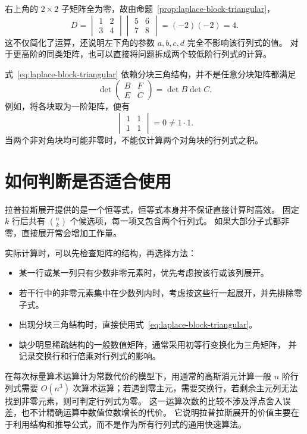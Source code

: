 \documentclass[UTF8,12pt,a4paper,fontset=fandol]{ctexart}
\begin{document}
\begin{solve}
右上角的 $2\times2$ 子矩阵全为零，故由命题~\ref{prop:laplace-block-triangular}，
\[
  D=\begin{vmatrix}1&2\\3&4\end{vmatrix}
    \begin{vmatrix}5&6\\7&8\end{vmatrix}
   =(-2)(-2)=4.
\]
这不仅简化了运算，还说明左下角的参数 $a,b,c,d$ 完全不影响该行列式的值。
对于更高阶的同类矩阵，也可以直接将问题拆成两个较低阶行列式的计算。
\end{solve}

\begin{remark}[零块条件不能随意去掉]
式~\eqref{eq:laplace-block-triangular} 依赖分块三角结构，并不是任意分块矩阵都满足
\[
  \det\begin{pmatrix}B&F\\E&C\end{pmatrix}=\det B\det C.
\]
例如，将各块取为一阶矩阵，便有
\[
  \begin{vmatrix}1&1\\1&1\end{vmatrix}=0\neq1\cdot1.
\]
当两个非对角块均可能非零时，不能仅计算两个对角块的行列式之积。
\end{remark}

\section{如何判断是否适合使用}

拉普拉斯展开提供的是一个恒等式，恒等式本身并不保证直接计算时高效。
固定 $k$ 行后共有 $\binom nk$ 个候选项，每一项又包含两个行列式。
如果大部分子式都非零，直接展开常会增加工作量。

实际计算时，可以先检查矩阵的结构，再选择方法：
\begin{itemize}
  \item 某一行或某一列只有少数非零元素时，优先考虑按该行或该列展开。
  \item 若干行中的非零元素集中在少数列内时，考虑按这些行一起展开，并先排除零子式。
  \item 出现分块三角结构时，直接使用式~\eqref{eq:laplace-block-triangular}。
  \item 缺少明显稀疏结构的一般数值矩阵，通常采用初等行变换化为三角矩阵，
  并记录交换行和行倍乘对行列式的影响。
\end{itemize}

在每次标量算术运算计为常数代价的模型下，用通常的高斯消元计算一般 $n$ 阶行列式需要
$O(n^3)$ 次算术运算；若遇到零主元，需要交换行，若剩余主元列无法找到非零元素，则可判定行列式为零。
这一运算次数的比较不涉及浮点舍入误差，也不计精确运算中数值位数增长的代价。
它说明拉普拉斯展开的价值主要在于利用结构和推导公式，而不是作为所有行列式的通用快速算法。
\end{document}
